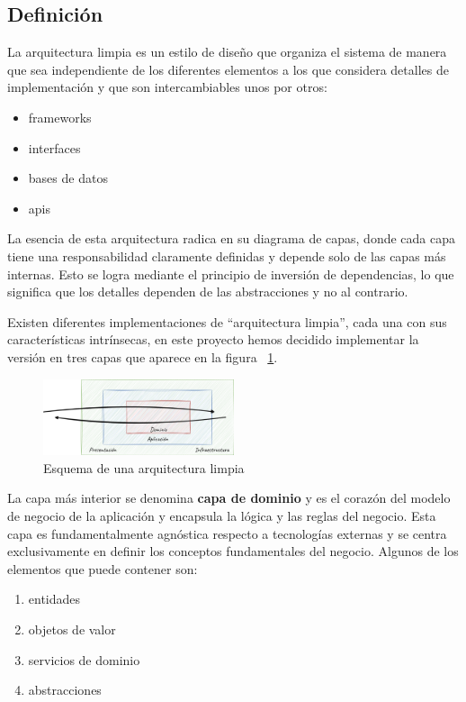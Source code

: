 \subsection*{Definición}
La arquitectura limpia es un estilo de diseño que organiza el sistema de manera que sea independiente de los diferentes
elementos a los que considera detalles de implementación y que son intercambiables unos por otros:

\begin{itemize}
    \item frameworks
    \item interfaces
    \item bases de datos
    \item apis
\end{itemize}

La esencia de esta arquitectura radica en su diagrama de capas, donde cada capa tiene una responsabilidad claramente
definidas y depende solo de las capas más internas.
Esto se logra mediante el principio de inversión de dependencias, lo que significa que los detalles dependen de las
abstracciones y no al contrario.

Existen diferentes implementaciones de ``arquitectura limpia'', cada una con sus características intrínsecas, en este
proyecto hemos decidido implementar la versión en tres capas que aparece en la figura
~\ref{fig:chapter_2.clean_architecture}.

\begin{figure}[ht]
    \begin{center}
        \includegraphics[width=0.5\textwidth]{./chapter/2/images/chapter_2.clean_architecture}
        \caption{Esquema de una arquitectura limpia}
        \label{fig:chapter_2.clean_architecture}
    \end{center}
\end{figure}

La capa más interior se denomina \textbf{capa de dominio} y es el corazón del modelo de negocio de la aplicación y
encapsula la lógica y las reglas del negocio.
Esta capa es fundamentalmente agnóstica respecto a tecnologías externas y se centra exclusivamente en definir los
conceptos fundamentales del negocio.
Algunos de los elementos que puede contener son:
\begin{enumerate}
    \item entidades
    \item objetos de valor
    \item servicios de dominio
    \item abstracciones
\end{enumerate}

